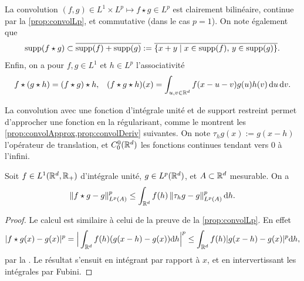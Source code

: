 La convolution $(f,g)\in L^1 \times L^p \mapsto f \star g \in L^p$ est clairement bilinéaire, continue par la \cref{prop:convolLp}, et commutative (dans le cas $p=1$). 
On note également que %
\begin{equation}
\label{eq:suppConvol}
\leancheck{eq:suppConvol}%
	\supp(f\star g) \subset \overline {\supp(f) + \supp(g)} 
	:= \overline{\{x+y \mid x\in \supp(f),\, y\in \supp(g)\}}. %
\end{equation}
Enfin, on a pour $f,g \in L^1$ et $h \in L^p$ l'associativité 
\begin{align*}
	f\star (g\star h) &= (f\star g) \star h, &
	(f\star g \star h)(x) = \int_{u,v \in \mathbb{R}^d} f(x-u-v) g(u) h(v) \, \mathrm{d} u \, \mathrm{d} v.
\end{align*}

La convolution avec une fonction d'intégrale unité et de support restreint permet d'approcher une fonction en la régularisant, comme le montrent les \cref{prop:convolApprox,prop:convolDeriv} suivantes.
On note $\tau_h g(x) := g(x-h)$ l'opérateur de translation, et $C^0_0(\mathbb{R}^d)$ les fonctions continues tendant vers $0$ à l'infini.
\begin{lemma}
\label{lem:convolTranslat}
%
Soit $f \in L^1(\mathbb{R}^d,\mathbb{R}_+)$ d'intégrale unité, $g \in L^p(\mathbb{R}^d)$, et $A \subset \mathbb{R}^d$ mesurable. On a
\begin{equation*}
	\|f \star g - g\|^p_{L^p(A)} \leq \int_{\mathbb{R}^d} f(h) \, \|\tau_h g - g\|^p_{L^p(A)} \, \mathrm{d} h.
\end{equation*}	
\end{lemma}
\begin{proof}
	Le calcul est similaire à celui de la preuve de la \cref{prop:convolLp}. En effet
	\begin{equation*}
		|f\star g(x) - g(x)|^p = \Big|\int_{\mathbb{R}^d} f(h) (g(x-h)-g(x)) \mathrm{d} h\Big|^p \leq \int_{\mathbb{R}^d} f(h) |g(x-h)-g(x)|^p \mathrm{d} h,
	\end{equation*}
	par la .
	Le résultat s'ensuit en intégrant par rapport à $x$, et en intervertissant les intégrales par Fubini.
\end{proof}

